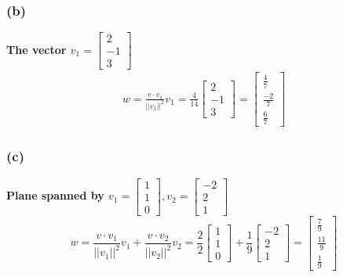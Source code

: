 \documentclass[10pt,letterpaper]{article}
\begin{document}
		\subsubsection*{(b)}  \textbf{The vector $v_1 = \begin{bmatrix}
			2 \\ -1 \\ 3
			\end{bmatrix}$} 
		\begin{align*}
		w = \frac{v \cdot v_1}{||v_1||^2}v_1 = \frac{4}{14} \begin{bmatrix}
		2 \\ -1 \\ 3
		\end{bmatrix} = \boxed{ \begin{bmatrix}
			\frac{4}{7} \\ \frac{-2}{7} \\ \frac{6}{7}
			\end{bmatrix} }
		\end{align*}
		\subsubsection*{(c)} \textbf{Plane spanned by $v_1 = \begin{bmatrix}
			1 \\ 1 \\ 0
			\end{bmatrix}, v_2 = \begin{bmatrix}
			-2 \\ 2 \\ 1
			\end{bmatrix}$} 
			$$
			w = \frac{v \cdot v_1}{||v_1||^2} v_1 + \frac{v \cdot v_2}{||v_2||^2} v_2 = \frac{2}{2} \begin{bmatrix}
			1 \\ 1 \\ 0
			\end{bmatrix} + \frac{1}{9} \begin{bmatrix}
			-2 \\ 2 \\ 1
			\end{bmatrix} = \boxed{ \begin{bmatrix}
			\frac{7}{9} \\ \frac{11}{9} \\ \frac{1}{9}
			\end{bmatrix} }
			$$
\end{document}
